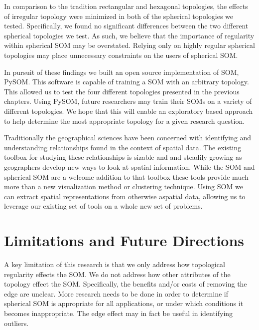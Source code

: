 In comparison to the tradition rectangular and hexagonal topologies, the effects
of irregular topology were minimized in both of the spherical
topologies we tested.  Specifically, we found no significant differences
between the two different spherical topologies we test.  As such, we believe
that the importance of regularity within spherical SOM may be overstated.
Relying only on highly regular spherical topologies may place
unnecessary constraints on the users of spherical SOM.  

In pursuit of these findings we built an open source implementation of SOM,
PySOM. This software is capable of training a SOM with an arbitrary
topology.  This allowed us to test the four different topologies presented in
the previous chapters.  Using PySOM, future researchers may train their
SOMs on a variety of different topologies.  We hope that this will enable an
exploratory based approach to help determine the most appropriate topology for
a given research question.

Traditionally the geographical sciences have been concerned with identifying and
understanding relationships found in the context of spatial data.  
The existing toolbox for studying these relationships is sizable and
and steadily growing as geographers develop new ways to look at spatial
information.  While the SOM and spherical SOM are a welcome addition to that
toolbox these tools provide much more than a new visualization method or
clustering technique.  Using SOM we can extract spatial representations from
otherwise aspatial data, allowing us to leverage our existing set of
tools on a whole new set of problems.

\section{Limitations and Future Directions}
A key limitation of this research is that we only address how topological
regularity effects the SOM.  We do not address how other attributes of the
topology effect the SOM. Specifically, the benefits and/or costs of removing the
edge are unclear.  More research needs to be done in order to determine if spherical SOM
is appropriate for all applications, or under which conditions it becomes
inappropriate.  The edge effect may in fact be useful in identifying outliers.






